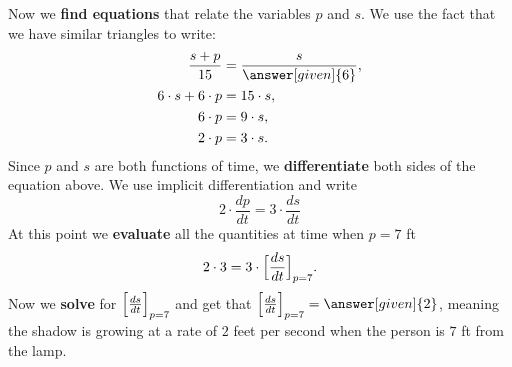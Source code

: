 \documentclass{ximera}
\begin{document}
\begin{example}
\begin{explanation}
    Now we \textbf{find equations} that relate the variables $p$ and $s$. We use the fact that we
    have similar triangles to write:
    \begin{align*}
      \frac{s+p}{15} &= \frac{s}{\answer[given]{6}},\\
      6\cdot s + 6 \cdot p &= 15\cdot s,\\
      6\cdot p &=9\cdot s,\\
      2\cdot p &=3 \cdot s. 
    \end{align*}
    Since $p$ and $s$ are both functions of time, we 
  \textbf{differentiate} both sides of the equation above. We  use
    implicit differentiation and write
        \[
    2\cdot \frac{dp}{dt} =3 \cdot \frac{ds}{dt}
    \]
    At this point we \textbf{evaluate} all the quantities at time when $p=7$ ft 
    \[
    2\cdot 3 = 3 \cdot \Bigl[\frac{ds}{dt}\Bigr]_{p=7}.
    \]
    Now we \textbf{solve} for  $\Bigl[\frac{ds}{dt}\Bigr]_{p=7} $ and get that
     $\Bigl[\frac{ds}{dt}\Bigr]_{p=7} = \answer[given]{2}$, 
      meaning the shadow is growing
    at a rate of $2$ feet per second when the person is $7$ ft from the lamp.\\
  \end{explanation}
\end{example}
\end{document}
